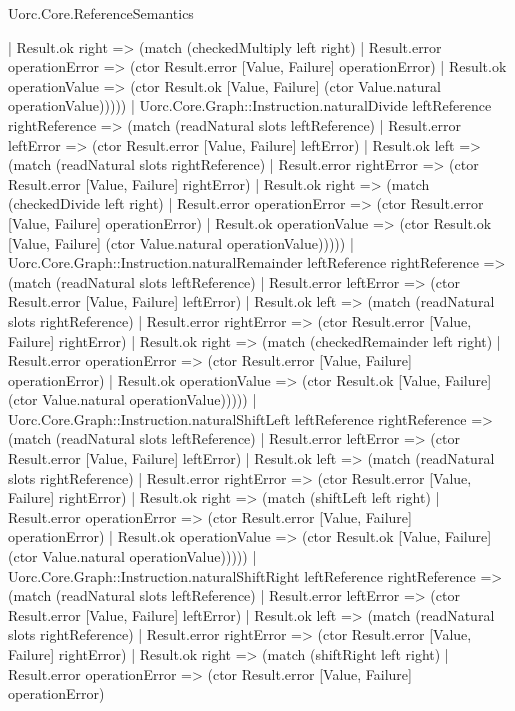 \begin{lexlean}{Uorc.Core.ReferenceSemantics}
\begin{semanticmodule}
{        | Result.ok right => (match (checkedMultiply left right)
          | Result.error operationError => (ctor Result.error [Value, Failure] operationError)
          | Result.ok operationValue => (ctor Result.ok [Value, Failure] (ctor Value.natural operationValue)))))
    | Uorc.Core.Graph::Instruction.naturalDivide leftReference rightReference => (match (readNatural slots leftReference)
      | Result.error leftError => (ctor Result.error [Value, Failure] leftError)
      | Result.ok left => (match (readNatural slots rightReference)
        | Result.error rightError => (ctor Result.error [Value, Failure] rightError)
        | Result.ok right => (match (checkedDivide left right)
          | Result.error operationError => (ctor Result.error [Value, Failure] operationError)
          | Result.ok operationValue => (ctor Result.ok [Value, Failure] (ctor Value.natural operationValue)))))
    | Uorc.Core.Graph::Instruction.naturalRemainder leftReference rightReference => (match (readNatural slots leftReference)
      | Result.error leftError => (ctor Result.error [Value, Failure] leftError)
      | Result.ok left => (match (readNatural slots rightReference)
        | Result.error rightError => (ctor Result.error [Value, Failure] rightError)
        | Result.ok right => (match (checkedRemainder left right)
          | Result.error operationError => (ctor Result.error [Value, Failure] operationError)
          | Result.ok operationValue => (ctor Result.ok [Value, Failure] (ctor Value.natural operationValue)))))
    | Uorc.Core.Graph::Instruction.naturalShiftLeft leftReference rightReference => (match (readNatural slots leftReference)
      | Result.error leftError => (ctor Result.error [Value, Failure] leftError)
      | Result.ok left => (match (readNatural slots rightReference)
        | Result.error rightError => (ctor Result.error [Value, Failure] rightError)
        | Result.ok right => (match (shiftLeft left right)
          | Result.error operationError => (ctor Result.error [Value, Failure] operationError)
          | Result.ok operationValue => (ctor Result.ok [Value, Failure] (ctor Value.natural operationValue)))))
    | Uorc.Core.Graph::Instruction.naturalShiftRight leftReference rightReference => (match (readNatural slots leftReference)
      | Result.error leftError => (ctor Result.error [Value, Failure] leftError)
      | Result.ok left => (match (readNatural slots rightReference)
        | Result.error rightError => (ctor Result.error [Value, Failure] rightError)
        | Result.ok right => (match (shiftRight left right)
          | Result.error operationError => (ctor Result.error [Value, Failure] operationError)
}
\end{semanticmodule}
\end{lexlean}

